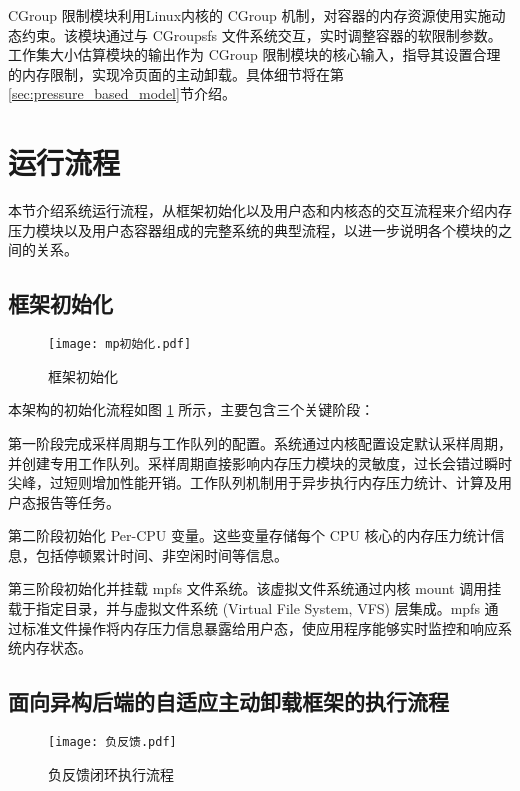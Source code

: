  CGroup 限制模块利用Linux内核的 CGroup 机制，对容器的内存资源使用实施动态约束。该模块通过与 CGroupsfs 文件系统交互，实时调整容器的软限制参数。工作集大小估算模块的输出作为 CGroup 限制模块的核心输入，指导其设置合理的内存限制，实现冷页面的主动卸载。具体细节将在第\ref{sec:pressure_based_model}节介绍。

\section{运行流程}

本节介绍系统运行流程，从框架初始化以及用户态和内核态的交互流程来介绍内存压力模块以及用户态容器组成的完整系统的典型流程，以进一步说明各个模块的之间的关系。

\subsection{框架初始化}

\begin{figure}[htb]
    \centering
    \texttt{[image: mp初始化.pdf]}
    \caption{框架初始化}
    \label{fig:framework_initialization}
\end{figure}

本架构的初始化流程如图 \ref{fig:framework_initialization} 所示，主要包含三个关键阶段：

第一阶段完成采样周期与工作队列的配置。系统通过内核配置设定默认采样周期，并创建专用工作队列。采样周期直接影响内存压力模块的灵敏度，过长会错过瞬时尖峰，过短则增加性能开销。工作队列机制用于异步执行内存压力统计、计算及用户态报告等任务。

第二阶段初始化 Per-CPU 变量。这些变量存储每个 CPU 核心的内存压力统计信息，包括停顿累计时间、非空闲时间等信息。

第三阶段初始化并挂载 mpfs 文件系统。该虚拟文件系统通过内核 mount 调用挂载于指定目录，并与虚拟文件系统 (Virtual File System, VFS) 层集成。mpfs 通过标准文件操作将内存压力信息暴露给用户态，使应用程序能够实时监控和响应系统内存状态。

\subsection{面向异构后端的自适应主动卸载框架的执行流程}
\label{sec:面向异构后端的自适应主动卸载框架的执行流程}

\begin{figure}[htb]
\centering
\texttt{[image: 负反馈.pdf]}
\caption{负反馈闭环执行流程}
\label{fig:feedback_loop}
\end{figure}

